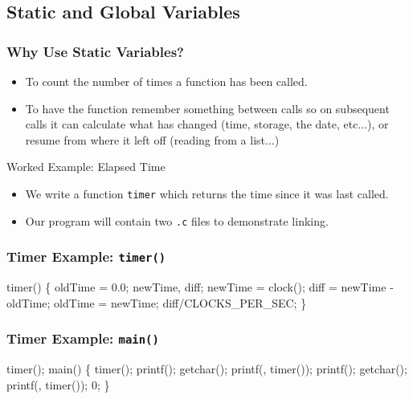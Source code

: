 \documentclass[smaller,handout,table]{beamer}
\begin{document}
\subsection{Static and Global Variables}
\begin{frame}
\frametitle{Why Use Static Variables?}
\begin{itemize}
\item To count the number of times a function has been called.
\item To have the function remember something between calls so on subsequent calls it can calculate what has changed (time, storage, the date, etc...), or resume from where it left off (reading from a list...)
\end{itemize}

\begin{exampleblock}{Worked Example: Elapsed Time}
\begin{itemize}
\item We write a function {\tt timer} which returns the time since it was last called.
\item Our program will contain two {\tt .c} files to demonstrate linking.
\end{itemize}
\end{exampleblock}
\end{frame}

\begin{frame}[fragile]
\frametitle{Timer Example: {\tt timer()}}
\begin{semiverbatim}
\kr\kl{}  
\kl
\kl{} timer()
\kl\{
\kl   {} oldTime = 0.0;
\kl   {} newTime, diff;
\kl
\kl   newTime = clock();
\kl   diff = newTime - oldTime;
\kl   oldTime = newTime;
\kl   {} diff/CLOCKS_PER_SEC;
\kl\}
\end{semiverbatim}
\end{frame}

\begin{frame}[fragile]
\frametitle{Timer Example: {\tt main()}}
\begin{semiverbatim}
\small
\kr\kl{} 
\kl
\kl{} timer(); 
\kl
\kl{} main()
\kl\{
\kl   timer(); 
\kl   printf();
\kl   getchar(); 
\kl   printf(, timer());
\kl   printf();
\kl   getchar();
\kl   printf(, timer());
\kl   {} 0;
\kl\}
\end{semiverbatim}
\end{frame}
\end{document}
